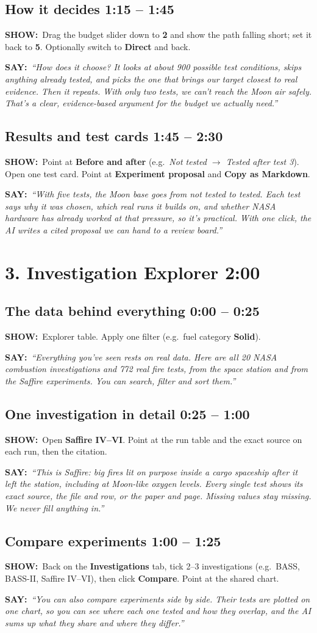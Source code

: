 \documentclass[11pt,a4paper]{article}
\newcommand{\showit}[1]{\par\textbf{\color{showc}SHOW:}\ #1\par}
\newcommand{\sayit}[1]{\par\textbf{\color{sayc}SAY:}\ \textit{``#1''}\par\medskip}
\newcommand{\step}[2]{\subsection{#1 \hfill\normalsize\color{muted}#2}}
\begin{document}
\step{How it decides}{1:15 -- 1:45}
\showit{Drag the budget slider down to \textbf{2} and show the path falling short; set it back to \textbf{5}. Optionally switch to \textbf{Direct} and back.}
\sayit{How does it choose? It looks at about 900 possible test conditions, skips anything already tested, and picks the one that brings our target closest to real evidence. Then it repeats. With only two tests, we can't reach the Moon air safely. That's a clear, evidence-based argument for the budget we actually need.}

\step{Results and test cards}{1:45 -- 2:30}
\showit{Point at \textbf{Before and after} (e.g.\ \textit{Not tested $\rightarrow$ Tested after test 3}). Open one test card. Point at \textbf{Experiment proposal} and \textbf{Copy as Markdown}.}
\sayit{With five tests, the Moon base goes from not tested to tested. Each test says why it was chosen, which real runs it builds on, and whether NASA hardware has already worked at that pressure, so it's practical. With one click, the AI writes a cited proposal we can hand to a review board.}

\section{3. Investigation Explorer \hfill \normalsize 2:00}

\step{The data behind everything}{0:00 -- 0:25}
\showit{Explorer table. Apply one filter (e.g.\ fuel category \textbf{Solid}).}
\sayit{Everything you've seen rests on real data. Here are all 20 NASA combustion investigations and 772 real fire tests, from the space station and from the Saffire experiments. You can search, filter and sort them.}

\step{One investigation in detail}{0:25 -- 1:00}
\showit{Open \textbf{Saffire IV--VI}. Point at the run table and the exact source on each run, then the citation.}
\sayit{This is Saffire: big fires lit on purpose inside a cargo spaceship after it left the station, including at Moon-like oxygen levels. Every single test shows its exact source, the file and row, or the paper and page. Missing values stay missing. We never fill anything in.}

\step{Compare experiments}{1:00 -- 1:25}
\showit{Back on the \textbf{Investigations} tab, tick 2--3 investigations (e.g.\ BASS, BASS-II, Saffire IV--VI), then click \textbf{Compare}. Point at the shared chart.}
\sayit{You can also compare experiments side by side. Their tests are plotted on one chart, so you can see where each one tested and how they overlap, and the AI sums up what they share and where they differ.}
\end{document}

